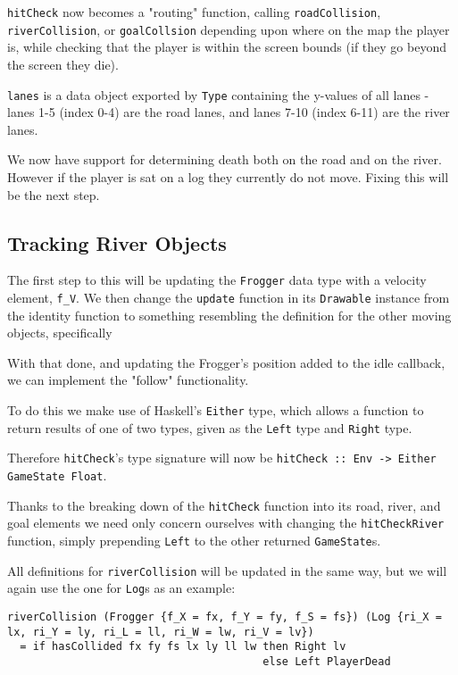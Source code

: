 \documentclass[12pt, a4paper]{report}
\begin{document}
\verb|hitCheck| now becomes a "routing" function, calling \verb|roadCollision|, \verb|riverCollision|, or \verb|goalCollsion| depending upon where on the map the player is, while checking that the player is within the screen bounds (if they go beyond the screen they die).

\verb|lanes| is a data object exported by \verb|Type| containing the y-values of all lanes - lanes 1-5 (index 0-4) are the road lanes, and lanes 7-10 (index 6-11) are the river lanes.

We now have support for determining death both on the road and on the river.
However if the player is sat on a log they currently do not move.
Fixing this will be the next step.

\subsection{Tracking River Objects}

The first step to this will be updating the \verb|Frogger| data type with a velocity element, \verb|f_V|.
We then change the \verb|update| function in its \verb|Drawable| instance from the identity function to something resembling the definition for the other moving objects, specifically

With that done, and updating the Frogger's position added to the idle callback, we can implement the "follow" functionality.

\par

To do this we make use of Haskell's \verb|Either| type, which allows a function to return results of one of two types, given as the \verb|Left| type and \verb|Right| type.

Therefore \verb|hitCheck|'s type signature will now be \verb|hitCheck :: Env -> Either GameState Float|.

Thanks to the breaking down of the \verb|hitCheck| function into its road, river, and goal elements we need only concern ourselves with changing the \verb|hitCheckRiver| function, simply prepending \verb|Left| to the other returned \verb|GameState|s.

All definitions for \verb|riverCollision| will be updated in the same way, but we will again use the one for \verb|Log|s as an example:

\begin{lstlisting}
riverCollision (Frogger {f_X = fx, f_Y = fy, f_S = fs}) (Log {ri_X = lx, ri_Y = ly, ri_L = ll, ri_W = lw, ri_V = lv})
  = if hasCollided fx fy fs lx ly ll lw then Right lv
                                        else Left PlayerDead

\end{lstlisting}
\end{document}
